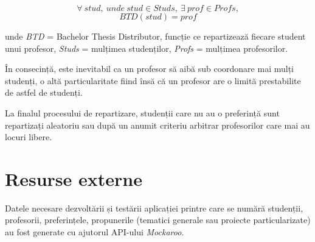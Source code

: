 \[\forall \: stud,\: unde\: stud \in Studs,\: \exists \: prof \in Profs,\] 
\[BTD(stud)=prof\]

unde \textit{BTD} = Bachelor Thesis Distributor, funcție ce repartizează fiecare student unui profesor, \textit{Studs} = mulțimea studenților, \textit{Profs} = mulțimea profesorilor.

În consecință, este inevitabil ca un profesor să aibă sub coordonare mai mulți studenți, o altă particularitate fiind însă că un profesor are o limită prestabilite de astfel de studenți.

La finalul procesului de repartizare, studenții care nu au o preferință sunt repartizați aleatoriu sau după un anumit criteriu arbitrar profesorilor care mai au locuri libere.

\section{Resurse externe}
Datele necesare dezvoltării și testării aplicației printre care se numără studenții, profesorii, preferințele, propunerile (tematici generale sau proiecte particularizate) au fost generate cu ajutorul API-ului \textit{Mockaroo}.